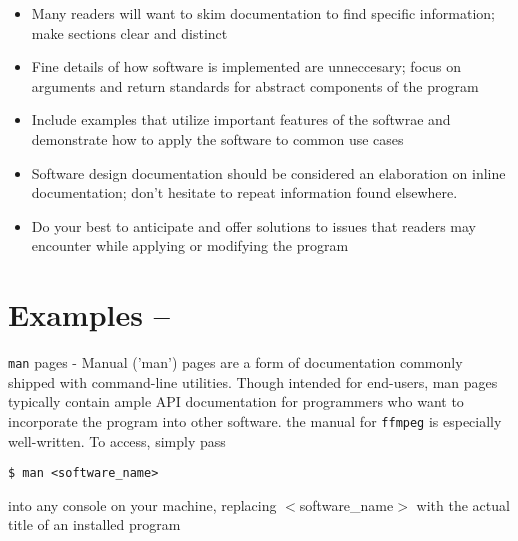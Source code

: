\documentclass[12pt]{article}
\begin{document}
\begin{multicols}{2}
	\begin{itemize}
		\item{Many readers will want to skim documentation to find specific information; make sections clear and distinct}
		\item{Fine details of how software is implemented are unneccesary; focus on arguments and return standards for abstract components of the program}
		\item{Include examples that utilize important features of the softwrae and demonstrate how to apply the software to common use cases}
		\item{Software design documentation should be considered an elaboration on inline documentation; don't hesitate to repeat information found elsewhere.}
		\item{Do your best to anticipate and offer solutions to issues that readers may encounter while applying or modifying the program}
	\end{itemize}

	\section{Examples --}

	\texttt{man} pages - Manual ('man') pages are a form of documentation commonly shipped with command-line utilities. Though intended for end-users, man pages typically contain ample API documentation for programmers who want to incorporate the program into other software. the manual for \texttt{ffmpeg} is especially well-written. To access, simply pass

	\begin{center}
		\texttt{\$ man <software\_name>}
	\end{center}

	\noindent
	into any console on your machine, replacing $<$software\_name$>$ with the actual title of an installed program

\end{multicols}

\printbibliography
\end{document}
